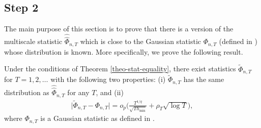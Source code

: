 \documentclass[a4paper,12pt]{article}
\makeatletter
\renewcommand{\eqref}[1]{\tagform@{\ref{#1}}}
\newcommand{\doublehattwo}[1]{\widehat{\widehat{#1}}}
\makeatother
\begin{document}
\subsection*{Step 2}

The main purpose of this section is to prove that there is a version of the multiscale statistic $\doublehattwo{\Phi}_{n,T}$ which is close to the Gaussian statistic $\Phi_{n,T}$ (defined in \eqref{eq-stat-5}) whose distribution is known. More specifically, we prove the following result. 

\begin{propA}\label{propA-strong-approx-equality}
Under the conditions of Theorem \ref{theo-stat-equality}, there exist statistics $\widetilde{\Phi}_{n,T}$ for $T = 1,2,\ldots$ with the following two properties: (i) $\widetilde{\Phi}_{n, T}$ has the same distribution as $\doublehattwo{\Phi}_{n, T}$ for any $T$, and (ii)
\begin{align}\label{eq-strong-approx-equality}
\big| \widetilde{\Phi}_{n, T} - \Phi_{n,T} \big| = o_p \Big( \frac{T^{1/q}}{\sqrt{T h_{\min}}} + \rho_T\sqrt{\log T} \Big),
\end{align}
where $\Phi_{n,T}$ is a Gaussian statistic as defined in \eqref{eq-stat-5}. 
\end{propA}
\end{document}
